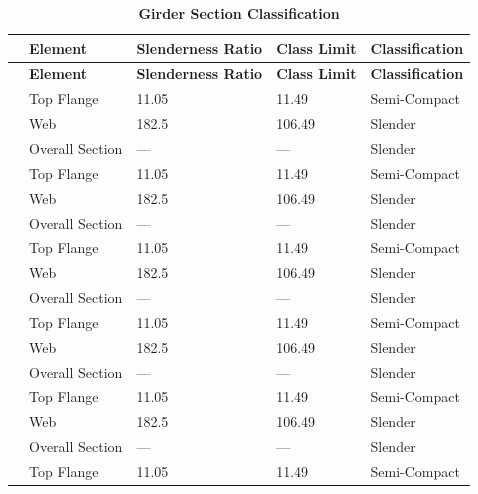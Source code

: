 \documentclass[12pt,a4paper]{report}
\numberwithin{table}{chapter}
\numberwithin{figure}{chapter}
\newcommand{\ReportTableRowGap}{6pt}
\begin{document}
\vspace{1em}
\begin{longtable}{|C{2.5cm}|L{3cm}|C{3.5cm}|C{2.5cm}|>{\centering\arraybackslash}p{4.0cm}|}
\caption{\textbf{Girder Section Classification}}\\
\hline
\textbf{} & \textbf{Element} & \textbf{Slenderness Ratio} & \textbf{Class Limit} & \textbf{Classification} \\[\ReportTableRowGap]
\hline
\endfirsthead
\hline
\textbf{} & \textbf{Element} & \textbf{Slenderness Ratio} & \textbf{Class Limit} & \textbf{Classification} \\[\ReportTableRowGap]
\hline
\endhead

 & Top Flange & 11.05 & 11.49 & Semi-Compact \\[\ReportTableRowGap]
 & Web & 182.5 & 106.49 & Slender \\[\ReportTableRowGap]
 & Overall Section & --- & --- & Slender \\[\ReportTableRowGap]
\hline
{} & Top Flange & 11.05 & 11.49 & Semi-Compact \\[\ReportTableRowGap]
 & Web & 182.5 & 106.49 & Slender \\[\ReportTableRowGap]
 & Overall Section & --- & --- & Slender \\[\ReportTableRowGap]
\hline
{} & Top Flange & 11.05 & 11.49 & Semi-Compact \\[\ReportTableRowGap]
 & Web & 182.5 & 106.49 & Slender \\[\ReportTableRowGap]
 & Overall Section & --- & --- & Slender \\[\ReportTableRowGap]
\hline
{} & Top Flange & 11.05 & 11.49 & Semi-Compact \\[\ReportTableRowGap]
 & Web & 182.5 & 106.49 & Slender \\[\ReportTableRowGap]
 & Overall Section & --- & --- & Slender \\[\ReportTableRowGap]
\hline
{} & Top Flange & 11.05 & 11.49 & Semi-Compact \\[\ReportTableRowGap]
 & Web & 182.5 & 106.49 & Slender \\[\ReportTableRowGap]
 & Overall Section & --- & --- & Slender \\[\ReportTableRowGap]
\hline
{} & Top Flange & 11.05 & 11.49 & Semi-Compact \\[\ReportTableRowGap]

\end{longtable}
\end{document}
